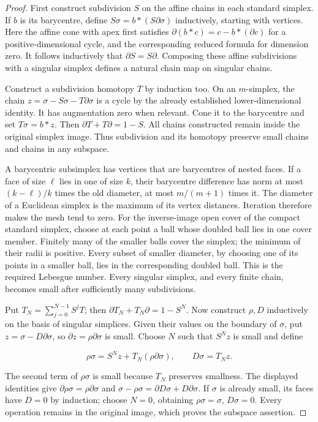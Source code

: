 \begin{proof}
First construct subdivision \(S\) on the affine chains in each standard simplex. If \(b\) is its barycentre, define \(S\sigma=b*(S\partial\sigma)\) inductively, starting with vertices. Here the affine cone with apex first satisfies
\(\partial(b*c)=c-b*(\partial c)\) for a positive-dimensional cycle, and the corresponding reduced formula for dimension zero. It follows inductively that \(\partial S=S\partial\). Composing these affine subdivisions with a singular simplex defines a natural chain map on singular chains.

Construct a subdivision homotopy \(T\) by induction too. On an \(m\)-simplex, the chain
\(z=\sigma-S\sigma-T\partial\sigma\) is a cycle by the already established lower-dimensional identity. It has augmentation zero when relevant. Cone it to the barycentre and set \(T\sigma=b*z\). Then
\(\partial T+T\partial=1-S\).
All chains constructed remain inside the original simplex image. Thus subdivision and its homotopy preserve small chains and chains in any subspace.

A barycentric subsimplex has vertices that are barycentres of nested faces. If a face of size \(\ell\) lies in one of size \(k\), their barycentre difference has norm at most \((k-\ell)/k\) times the old diameter, at most \(m/(m+1)\) times it. The diameter of a Euclidean simplex is the maximum of its vertex distances. Iteration therefore makes the mesh tend to zero. For the inverse-image open cover of the compact standard simplex, choose at each point a ball whose doubled ball lies in one cover member. Finitely many of the smaller balls cover the simplex; the minimum of their radii is positive. Every subset of smaller diameter, by choosing one of its points in a smaller ball, lies in the corresponding doubled ball. This is the required Lebesgue number. Every singular simplex, and every finite chain, becomes small after sufficiently many subdivisions.

Put \(T_N=\sum_{j=0}^{N-1}S^jT\); then
\(\partial T_N+T_N\partial=1-S^N\).
Now construct \(\rho,D\) inductively on the basis of singular simplices. Given their values on the boundary of \(\sigma\), put
\(z=\sigma-D\partial\sigma\), so \(\partial z=\rho\partial\sigma\) is small. Choose \(N\) such that \(S^Nz\) is small and define

\[
\rho\sigma=S^Nz+T_N(\rho\partial\sigma),
\qquad D\sigma=T_Nz.
\]

The second term of \(\rho\sigma\) is small because \(T_N\) preserves smallness. The displayed identities give
\(\partial\rho\sigma=\rho\partial\sigma\) and
\(\sigma-\rho\sigma=\partial D\sigma+D\partial\sigma\).
If \(\sigma\) is already small, its faces have \(D=0\) by induction; choose \(N=0\), obtaining \(\rho\sigma=\sigma\), \(D\sigma=0\). Every operation remains in the original image, which proves the subspace assertion.
\end{proof}

